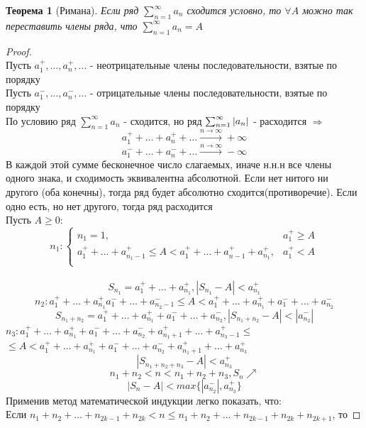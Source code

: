 \documentclass[a4paper]{article}
\newtheorem{theorem}{Теорема}
\theoremstyle{definition}
\newcommand\abs[1]{%
\mbox{$| #1 |$}}
\numberwithin{theorem}{subsection}
\numberwithin{lemma}{subsection}
\numberwithin{definition}{subsection}
\numberwithin{comment*}{subsection}
\numberwithin{consequence}{subsection}
\numberwithin{property}{subsection}
\begin{document}
\begin{theorem}[Римана]
 Если ряд $\sum_{n=1}^{\infty}{a_n}$ сходится условно, то $\forall{A}$ можно так переставить члены ряда, что $\sum_{n=1}^{\infty}{a_n} = A$
\end{theorem}
\begin{proof}
 \mbox{}\\
 Пусть $a_1^+ , \dots , a_n^+, \dots $ - неотрицательные члены последовательности, взятые по порядку\\
 Пусть $a_1^- , \dots , a_n^-, \dots $ - отрицательные члены последовательности, взятые по порядку\\
 По условию ряд $\sum_{n=1}^{\infty}{a_n}$ - сходится, но ряд $\sum_{n=1}^{\infty}{\abs{a_n}}$ - расходится $\Rightarrow$
 $$ a_1^+ + \dots + a_n^+ + \dots \xrightarrow{n \rightarrow \infty} +\infty$$
 $$ a_1^- + \dots + a_n^- + \dots \xrightarrow{n \rightarrow \infty} -\infty$$
 В каждой этой сумме бесконечное число слагаемых, иначе н.н.н все члены одного знака, и сходимость эквивалентна абсолютной. Если нет нитого ни другого (оба конечны), тогда ряд будет абсолютно сходится(противоречие). Если одно есть, но нет другого, тогда ряд расходится\\
 Пусть $A\geq0$:\\
 $$  n_1 : \begin{cases}
   n_1 = 1,                                                                    & a_1^+ \geq A \\
   a_1^+ + \dots + a_{n_1-1}^+ \leq A < a_1^+ + \dots + a_{n-1}^+ + a_{n_1}^+, & a_1^+ < A    \\
  \end{cases}$$
 \mbox{}\\
 $$ S_{n_1} = a_1^+ + \dots + a_{n_1}^+, \abs{S_{n_1} - A} < a_{n_1}^+$$
 $$ n_2: a_1^+ + \dots + a_{n_1}^+ a_1^- + \dots + a_{n_2 - 1}^- \leq A < a_1^+ + \dots + a_{n_1}^+ +a_1^- + \dots + a_{n_2}^- $$
 $$ S_{n_1 + n_2} = a_1^+ + \dots + a_{n_1}^+ +a_1^- + \dots + a_{n_2}^-, \abs{S_{n_1 + n_2} - A} < \abs{a_{n_2}^-} $$
 $ n_3: a_1^+ + \dots + a_{n_1}^+ +a_1^- + \dots + a_{n_2}^- + a_{n_1 + 1}^+ + \dots + a_{n_3 - 1}^+ \leq$\\
 $ \leq A < a_1^+ + \dots + a_{n_1}^+ +a_1^- + \dots + a_{n_2}^- + a_{n_1 + 1}^+ + \dots + a_{n_3}^+$
 $$ \abs{S_{n_1+n_2+n_3} - A} < a_{n_3}^+$$
 $$ n_1+n_2 < n < n_1 + n_2 +n_3, S_n \nearrow $$
 $$ \abs{S_n - A} < max\{\abs{a_{n_2}^-}, a_{n_3}^+ \}$$
 Применив метод математической индукции легко показать, что:\\
 Если $n_1 + n_2 + \dots +n_{2k-1} + n_{2k} < n \leq n_1 + n_2 + \dots + n_{2k-1} + n_{2k} + n_{2k+1}$, то

\end{proof}
\end{document}
